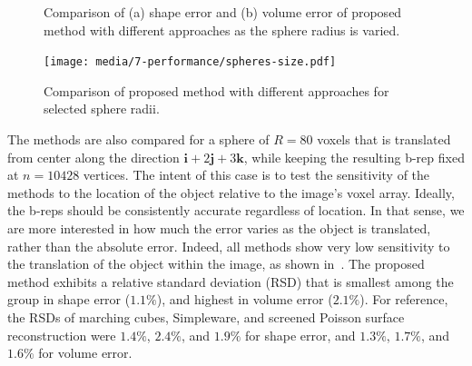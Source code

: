 \begin{figure}[ht!]
	\centering
	\caption{Comparison of (a) shape error and (b) volume error of proposed method with different approaches as the sphere radius is varied.}
	\label{fig:graph2}
\end{figure}
\begin{figure}[h!]
	\centering
	\texttt{[image: media/7-performance/spheres-size.pdf]}
	\caption{Comparison of proposed method with different approaches for selected sphere radii.}
	\label{fig:demos2}
\end{figure}
%
\noindent The methods are also compared for a sphere of $R = 80$ voxels that is translated from center along the direction $\bm{i}  + 2\bm{j} + 3\bm{k}$, while keeping the resulting b-rep fixed at $n = 10428$ vertices. The intent of this case is to test the sensitivity of the methods to the location of the object relative to the image's voxel array. Ideally, the b-reps should be consistently accurate regardless of location. {In that sense, we are more interested in how much the error varies as the object is translated, rather than the absolute error.} Indeed, all methods show very low sensitivity to the translation of the object within the image, as shown in~. {The proposed method exhibits a relative standard deviation (RSD) that is smallest among the group in shape error ($1.1\%$), and highest in volume error ($2.1\%$). For reference, the RSDs of marching cubes, Simpleware, and screened Poisson surface reconstruction were $1.4\%$, $2.4\%$, and $1.9\%$ for shape error, and $1.3\%$, $1.7\%$, and $1.6\%$ for volume error.} \\

